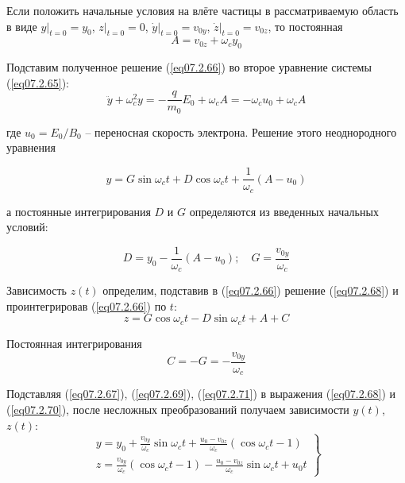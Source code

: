 Если положить начальные условия на влёте частицы в рассматриваемую область в 
виде \( y\Big|_{t=0} = y_0 \), \( z\Big|_{t=0} = 0 \), 
\( \dot{y}\Big|_{t=0} = v_{0y} \), \( \dot{z}\Big|_{t=0} = v_{0z} \), то 
постоянная
\begin{equation}
	A = v_{0z} + \omega_c y_0
	\label{eq07.2.67}
\end{equation}

Подставим полученное решение (\ref{eq07.2.66}) во второе уравнение системы 
(\ref{eq07.2.65}):
\[
	\ddot{y} + \omega^2_c y = -\frac{q}{m_0} E_0 + \omega_c A = 
		-\omega_c u_0 + \omega_c A
\]

где \( u_0 = E_0 / B_0 \) -- переносная скорость электрона. Решение этого 
неоднородного уравнения

\begin{equation}
	y = G\sin\omega_c t + D\cos\omega_c t + \frac{1}{\omega_c}( A - u_0 )
	\label{eq07.2.68}
\end{equation}

а постоянные интегрирования \( D \) и \( G \) определяются из введенных 
начальных условий:

\begin{equation}
	D = y_0 - \frac{1}{\omega_c}( A - u_0 ); \quad
	G = \frac{v_{0y}}{\omega_c}
	\label{eq07.2.69}
\end{equation}

Зависимость \( z(t) \) определим, подставив в (\ref{eq07.2.66}) решение 
(\ref{eq07.2.68}) и проинтегрировав (\ref{eq07.2.66}) по \( t \):
\begin{equation}
	z = G\cos\omega_c t - D\sin\omega_c t + A + C
	\label{eq07.2.70}
\end{equation}

Постоянная интегрирования
\begin{equation}
	C = -G = -\frac{v_{0y}}{\omega_c}
	\label{eq07.2.71}
\end{equation}

Подставляя (\ref{eq07.2.67}), (\ref{eq07.2.69}), (\ref{eq07.2.71}) в выражения 
(\ref{eq07.2.68}) и (\ref{eq07.2.70}), после несложных преобразований 
получаем зависимости \( y(t) \), \( z(t) \):
\begin{equation}
	\left. \begin{array}{c}
		y = y_0 + \frac{v_{0y}}{\omega_c}\sin\omega_c t +
			\frac{u_0-v_{0z}}{\omega_c}(\cos\omega_c t - 1) \\
		z = \frac{v_{0y}}{\omega_c}(\cos\omega_c t - 1 ) - 
			\frac{u_0-v_{0z}}{\omega_c}\sin\omega_c t + u_0 t
	\end{array} \right\}
	\label{eq07.2.72}
\end{equation}

